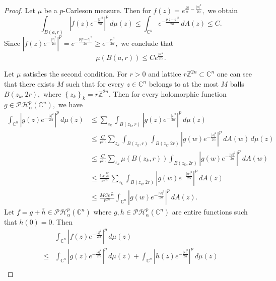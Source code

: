 \documentclass[10pt,a4paper]{amsart}
\newcommand{\ph}{\mathcal{PH}_\alpha^p(\mathbb{C}^n)}%
\begin{document}
\begin{proof}
	Let $\mu$ be a $p$-Carleson measure. Then for  $f(z)=e^{\frac{z \bar{a}}{\alpha}-\frac{|a|^2}{2\alpha}},$ we obtain
	\[
		\int_{B(a,r)}^{}\left| f(z)e^{-\frac{|z|^2}{2\alpha}} \right| ^{p}\, d\mu(z)\leq \int_{\mathbb{C}^{n}}^{}e^{-\frac{p|z-a|^2}{2\alpha}}\, dA(z)\leq  C.
	\]
	Since $\left| f(z)e^{-\frac{|z|^2}{2\alpha}} \right| ^p= e^{-\frac{p|z-a|^2}{2\alpha}}\geq e^{-\frac{pr^2}{2\alpha}},$ we conclude that
	\[
		\mu(B(a,r)) \leq C e^{\frac{pr^2}{2\alpha}}.
	\]


	Let $\mu$ satisfies the second condition. For $r>0$  and lattice $r\mathbb{Z}^{2n}\subset \mathbb{C}^{n}$ one can see that there exists $M$  such that for every $z \in \mathbb{C}^{n}$ belongs to at the most $M$ balls $B(z_k,2r),$ where $\left\{ z_k \right\} _k = r\mathbb{Z}^{2n}.$ Then for every holomorphic function $g \in \ph,$ we have
	\begin{align*}
		\int_{\mathbb{C}^{n}}^{}\left| g(z) e^{-\frac{|z|^2}{2\alpha}}\right| ^{p}\, d\mu(z)
		 & \leq \sum_{z_k}^{} \int_{B(z_k,r)}^{}\left| g(z)e^{-\frac{|z|^2}{2\alpha}} \right| ^{p}\, d\mu(z)                                              \\
		 & \leq \frac{C}{r^{2n}} \sum_{z_k}^{} \int_{B(z_k,r)}^{}\int_{B(z_k,2r)}^{}\left| g(w)e^{-\frac{|z|^2}{2\alpha}} \right| ^{p}\, dA(w) \, d\mu(z) \\
		 & \leq \frac{C}{r^{2n}}\sum_{z_k}^{} \mu(B(z_k,r))\int_{B(z_k,2r)}^{}\left| g(w)e^{-\frac{|w|^2}{2\alpha}} \right| ^{p}\, dA(w)                  \\
		 & \leq \frac{C e^{\frac{pr}{2\alpha}}}{r^{2n}}\sum_{z_k}^{} \int_{B(z_k,2r)}^{}\left| g(w)e^{-\frac{|w|^2}{2\alpha}} \right| ^{p}\, dA(z)        \\
		 & \leq \frac{M C e^{\frac{pr}{2\alpha}}}{r^{2n}} \int_{\mathbb{C}^{n}}^{}\left| g(w)e^{-\frac{|w|^2}{2\alpha}} \right| ^{p}\, dA(z) .
	\end{align*}
	Let $f =g+\bar{h} \in \ph$ where $g,h \in \ph$ are entire functions such that $h(0)=0.$ Then
	\begin{align*}
		     & \int_{\mathbb{C}^{n}}^{}\left| f(z)e^{-\frac{|z|^2}{2\alpha}} \right|^{p} \, d\mu(z)                                                                                              \\ \leq                                                                                                                    & \int_{\mathbb{C}^{n}}^{}\left| g(z)e^{-\frac{|z|^2}{2\alpha}} \right| ^p\, d\mu(z) + \int_{\mathbb{C}^{n}}^{}\left| h(z)e^{-\frac{|z|^2}{2\alpha}} \right| ^{p}	\, d\mu(z) \\

\end{align*}
\end{proof}
\end{document}
